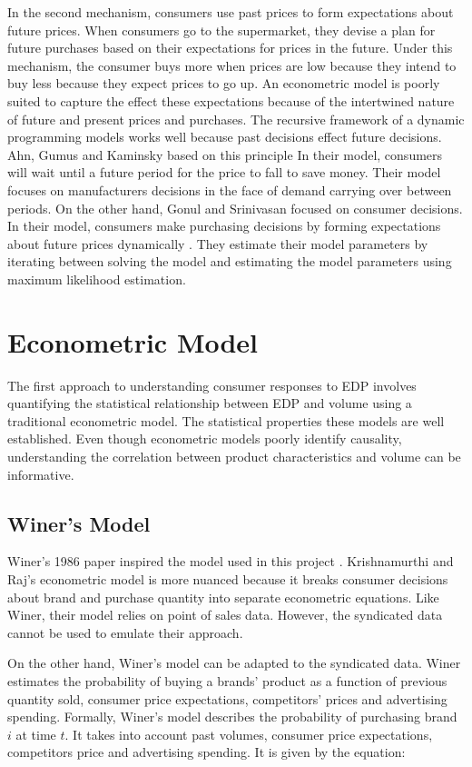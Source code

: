 \documentclass{article}
\begin{document}
In the second mechanism, consumers use past prices to form expectations about future prices. When consumers go to the supermarket, they devise a plan for future purchases based on their expectations for prices in the future. Under this mechanism, the consumer buys more when prices are low because they intend to buy less because they expect prices to go up. An econometric model is poorly suited to capture the effect these expectations because of the intertwined nature of future and present prices and purchases. The recursive framework of a dynamic programming models works well because past decisions effect future decisions. Ahn, Gumus and Kaminsky based on this principle \cite{ahn}  In their model, consumers will wait until a future period for the price to fall to save money. Their model focuses on manufacturers decisions in the face of demand carrying over between periods. On the other hand, Gonul and Srinivasan focused on consumer decisions. In their model, consumers make purchasing decisions by forming expectations about future prices dynamically \cite{gonul}. They estimate their model parameters by iterating between solving the model and estimating the model parameters using maximum likelihood estimation.

\section{Econometric Model}

The first approach to understanding consumer responses to EDP involves quantifying the statistical relationship between EDP and volume using a traditional econometric model. The statistical properties these models are well established. Even though econometric models poorly identify causality, understanding the correlation between product characteristics and volume can be informative.

\subsection{Winer's Model}

Winer's 1986 paper inspired the model used in this project \cite{winer}. Krishnamurthi and Raj's econometric model is more nuanced because it breaks consumer decisions about brand and purchase quantity into separate econometric equations. Like Winer, their model relies on point of sales data. However, the syndicated data cannot be used to emulate their approach. 

On the other hand, Winer's model can be adapted to the syndicated data. Winer estimates the probability of buying a brands' product as a function of previous quantity sold, consumer price expectations, competitors' prices and advertising spending. Formally, Winer's model describes the probability of purchasing brand $i$ at time $t$. It takes into account past volumes, consumer price expectations, competitors price and advertising spending. It is given by the equation: \\
\end{document}
